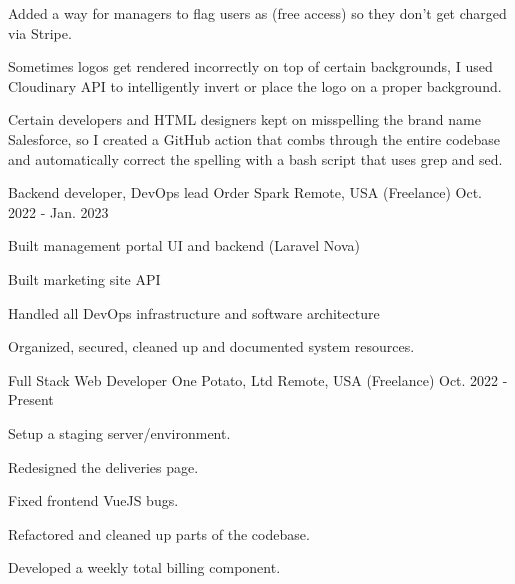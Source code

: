 \begin{cventries}
{\begin{cvitems}
        \item {Added a way for managers to flag users as (free access) so they don't get charged via Stripe.}
        \item {Sometimes logos get rendered incorrectly on top of certain backgrounds, I used Cloudinary API to intelligently invert or place the logo on a proper background.}
        \item {Certain developers and HTML designers kept on misspelling the brand name Salesforce, so I created a GitHub action that combs through the entire codebase and automatically correct the spelling with a bash script that uses grep and sed.}
      \end{cvitems}
     }

  \cventry
    {Backend developer, DevOps lead} %
    {Order Spark} %
    {Remote, USA (Freelance)} %
    {Oct. 2022 - Jan. 2023} %
    {
      \begin{cvitems} %
        \item {Built management portal UI and backend (Laravel Nova)}
        \item {Built marketing site API}
        \item {Handled all DevOps infrastructure and software architecture}
        \item {Organized, secured, cleaned up and documented system resources.}
      \end{cvitems}
    }

  \cventry
    {Full Stack Web Developer} %
    {One Potato, Ltd} %
    {Remote, USA (Freelance)} %
    {Oct. 2022 - Present} %
    {
      \begin{cvitems} %
        \item {Setup a staging server/environment.}
        \item {Redesigned the deliveries page.}
        \item {Fixed frontend VueJS bugs.}
        \item {Refactored and cleaned up parts of the codebase.}
        \item {Developed a weekly total billing component.}
      \end{cvitems}
    }


\end{cventries}

